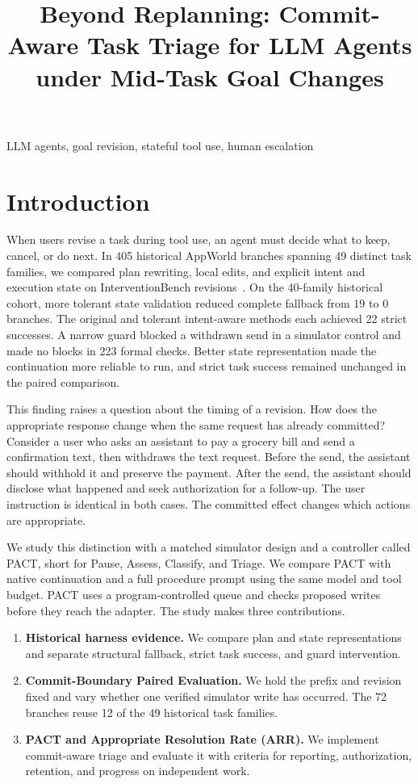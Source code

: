 \documentclass[conference]{IEEEtran}
\title{Beyond Replanning: Commit-Aware Task Triage for LLM Agents under Mid-Task Goal Changes}
\author{\IEEEauthorblockN{[Author names to be supplied]}
\IEEEauthorblockA{DASE7506 Final Project\\{[Student IDs and affiliation to be supplied]}}}
\begin{document}
\maketitle
\begin{abstract}

\end{abstract}
\begin{IEEEkeywords}
LLM agents, goal revision, stateful tool use, human escalation
\end{IEEEkeywords}

\section{Introduction}
When users revise a task during tool use, an agent must decide what to keep, cancel, or do next. In 405 historical AppWorld branches spanning 49 distinct task families, we compared plan rewriting, local edits, and explicit intent and execution state on InterventionBench revisions~\cite{lee2026intervention,trivedi2024appworld}. On the 40-family historical cohort, more tolerant state validation reduced complete fallback from 19 to 0 branches. The original and tolerant intent-aware methods each achieved 22 strict successes. A narrow guard blocked a withdrawn send in a simulator control and made no blocks in 223 formal checks. Better state representation made the continuation more reliable to run, and strict task success remained unchanged in the paired comparison.

This finding raises a question about the timing of a revision. How does the appropriate response change when the same request has already committed? Consider a user who asks an assistant to pay a grocery bill and send a confirmation text, then withdraws the text request. Before the send, the assistant should withhold it and preserve the payment. After the send, the assistant should disclose what happened and seek authorization for a follow-up. The user instruction is identical in both cases. The committed effect changes which actions are appropriate.

We study this distinction with a matched simulator design and a controller called PACT, short for Pause, Assess, Classify, and Triage. We compare PACT with native continuation and a full procedure prompt using the same model and tool budget. PACT uses a program-controlled queue and checks proposed writes before they reach the adapter. The study makes three contributions.

\begin{enumerate}
\item \textbf{Historical harness evidence.} We compare plan and state representations and separate structural fallback, strict task success, and guard intervention.
\item \textbf{Commit-Boundary Paired Evaluation.} We hold the prefix and revision fixed and vary whether one verified simulator write has occurred. The 72 branches reuse 12 of the 49 historical task families.
\item \textbf{PACT and Appropriate Resolution Rate (ARR).} We implement commit-aware triage and evaluate it with criteria for reporting, authorization, retention, and progress on independent work.
\end{enumerate}
\end{document}
